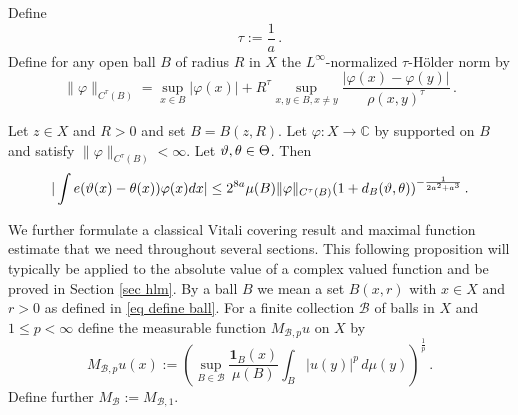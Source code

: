 Define
\begin{equation}
    \tau:=\frac 1a\, .
\end{equation}
Define for any open ball $B$ of radius $R$ in $X$ the $L^\infty$-normalized $\tau$-H\"older norm by
\begin{equation}
    \label{eq Hölder norm}
    \|\varphi\|_{C^\tau(B)} = \sup_{x \in B} |\varphi(x)| + R^\tau \sup_{x,y \in B, x \neq y} \frac{|\varphi(x) - \varphi(y)|}{\rho(x,y)^\tau}\,.
\end{equation}


\begin{prop}
    \label{Holder van der Corput}
     Let $z\in X$ and $R>0$ and set $B=B(z,R)$.
     Let $\varphi: X \to \mathbb{C}$ by
     supported on $B$ and satisfy $\|{\varphi}\|_{C^\tau(B)}<\infty$.
     Let $\vartheta, \theta \in \Theta$. Then
    \begin{equation}
        \label{eq vdc cond tau 2}
        |\int e(\vartheta(x)-{\theta(x)})\varphi(x) dx|\le
         2^{8a} \mu(B) \|{\varphi}\|_{C^\tau(B)}
       (1 + d_{B}(\vartheta,\theta))^{-\frac{1}{2a^2+a^3}}
    \,.
    \end{equation}
    \end{prop}

We further formulate a classical Vitali covering result
and maximal function estimate that we need throughout several sections.
This following proposition will typically be applied to the absolute value of a complex valued function and be proved in Section \ref{sec hlm}. By a ball $B$ we mean a set $B(x,r)$ with $x\in X$
and $r>0$ as defined in \eqref{eq define ball}.
For a finite collection $\mathcal{B}$ of balls in $X$
and $1\le p< \infty$ define the measurable function $M_{\mathcal{B},p}u$ on $X$ by
\begin{equation}\label{def hlm}
M_{\mathcal{B},p}u(x):=\left(\sup_{B\in \mathcal{B}} \frac{\mathbf{1}_{B}(x)}{\mu(B)}\int _{B} |u(y)|^p\, d\mu(y)\right)^\frac 1p\,  .
\end{equation}
Define further $M_{\mathcal{B}}:=M_{\mathcal{B},1}$.

